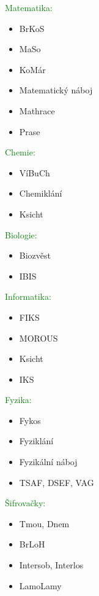 \documentclass[a5paper, twoside]{article}
\begin{document}
\begin{multicols}{3}
	\footnotesize
	\noindent\textcolor{green}{Matematika:}
	\begin{itemize}[leftmargin=10pt]
		\item BrKoS
		\item MaSo
		\item KoMár
		\item Matematický náboj
		\item Mathrace
		\item Prase
	\end{itemize}
	\textcolor{green}{Chemie:}
	\begin{itemize}[leftmargin=10pt]
		\item VíBuCh
		\item Chemiklání
		\item Ksicht
	\end{itemize}
	\vfill\null\columnbreak
	\textcolor{green}{Biologie:}
	\begin{itemize}[leftmargin=10pt]
		\item Biozvěst
		\item IBIS
	\end{itemize}
	\textcolor{green}{Informatika:}
	\begin{itemize}[leftmargin=10pt]
		\item FIKS
		\item MOROUS
		\item Ksicht
		\item IKS
	\end{itemize}
	\vfill\null\columnbreak
	\textcolor{green}{Fyzika:}
	\begin{itemize}[leftmargin=10pt]
		\item Fykos
		\item Fyziklání
		\item Fyzikální náboj
		\item TSAF, DSEF, VAG
	\end{itemize}
	\textcolor{green}{Šifrovačky:}
	\begin{itemize}[leftmargin=10pt]
		\item Tmou, Dnem
		\item BrLoH
		\item Intersob, Interlos
		\item LamoLamy
	\end{itemize}
	\vspace*{1em}
\end{multicols}

\normalsize
\pagebreak
\end{document}
